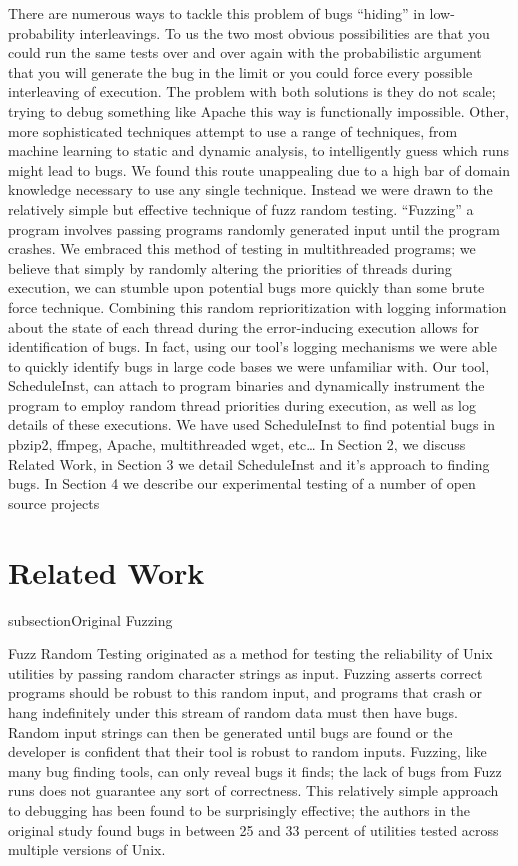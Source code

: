 \documentclass[10pt,]{article} %
\begin{document}
	There are numerous ways to tackle this problem of bugs “hiding” in low-probability interleavings.  To us the two most obvious possibilities are that you could run the same tests over and over again with the probabilistic argument that you will generate the bug in the limit or you could force every possible interleaving of execution.  The problem with both solutions is they do not scale; trying to debug something like Apache this way is functionally impossible.  Other, more sophisticated techniques attempt to use a range of techniques, from machine learning to static and dynamic analysis, to intelligently guess which runs might lead to bugs.  We found this route unappealing due to a high bar of domain knowledge necessary to use any single technique.  Instead we were drawn to the relatively simple but effective technique of fuzz random testing.  “Fuzzing” a program involves passing programs randomly generated input until the program crashes.  We embraced this method of testing in multithreaded programs; we believe that simply by randomly altering the priorities of threads during execution, we can stumble upon potential bugs more quickly than some brute force technique.  Combining this random reprioritization with logging information about the state of each thread during the error-inducing execution allows for identification of bugs.  In fact, using our tool’s logging mechanisms we were able to quickly identify bugs in large code bases we were unfamiliar with.  
	Our tool, ScheduleInst, can attach to program binaries and dynamically instrument the program to employ random thread priorities during execution, as well as log details of these executions.  We have used ScheduleInst to find potential bugs in pbzip2, ffmpeg, Apache, multithreaded wget, etc…  In Section 2, we discuss Related Work, in Section 3 we detail ScheduleInst and it’s approach to finding bugs.  In Section 4 we describe our experimental testing of a number of open source projects  

\section{Related Work}


subsection{Original Fuzzing}


Fuzz Random Testing originated as a method for testing the reliability of Unix utilities by passing random character strings as input.  Fuzzing asserts correct programs should be robust to this random input, and programs that crash or hang indefinitely under this stream of random data must then have bugs. Random input strings can then be generated until bugs are found or the developer is confident that their tool is robust to random inputs.  Fuzzing, like many bug finding tools, can only reveal bugs it finds; the lack of bugs from Fuzz runs does not guarantee any sort of correctness.  This relatively simple approach to debugging has been found to be surprisingly effective; the authors in the original study found bugs in between 25 and 33 percent of utilities tested across multiple versions of Unix.      
\end{document}

